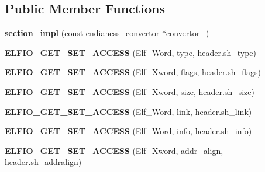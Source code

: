 \subsection*{Public Member Functions}
\begin{DoxyCompactItemize}
\item 
{\bfseries section\+\_\+impl} (const \hyperlink{class_e_l_f_i_o_1_1endianess__convertor}{endianess\+\_\+convertor} $\ast$convertor\+\_\+)\hypertarget{class_e_l_f_i_o_1_1section__impl_aa1aa0ba577737ec0f5debf8d917869cf}{}\label{class_e_l_f_i_o_1_1section__impl_aa1aa0ba577737ec0f5debf8d917869cf}

\item 
{\bfseries E\+L\+F\+I\+O\+\_\+\+G\+E\+T\+\_\+\+S\+E\+T\+\_\+\+A\+C\+C\+E\+SS} (Elf\+\_\+\+Word, type, header.\+sh\+\_\+type)\hypertarget{class_e_l_f_i_o_1_1section__impl_a87070f7ab5768e972178c462662b66c6}{}\label{class_e_l_f_i_o_1_1section__impl_a87070f7ab5768e972178c462662b66c6}

\item 
{\bfseries E\+L\+F\+I\+O\+\_\+\+G\+E\+T\+\_\+\+S\+E\+T\+\_\+\+A\+C\+C\+E\+SS} (Elf\+\_\+\+Xword, flags, header.\+sh\+\_\+flags)\hypertarget{class_e_l_f_i_o_1_1section__impl_a6e28fe60ec05be310ef82794ccc69c03}{}\label{class_e_l_f_i_o_1_1section__impl_a6e28fe60ec05be310ef82794ccc69c03}

\item 
{\bfseries E\+L\+F\+I\+O\+\_\+\+G\+E\+T\+\_\+\+S\+E\+T\+\_\+\+A\+C\+C\+E\+SS} (Elf\+\_\+\+Xword, size, header.\+sh\+\_\+size)\hypertarget{class_e_l_f_i_o_1_1section__impl_abb8836800cacb4adef4f040bd8960f38}{}\label{class_e_l_f_i_o_1_1section__impl_abb8836800cacb4adef4f040bd8960f38}

\item 
{\bfseries E\+L\+F\+I\+O\+\_\+\+G\+E\+T\+\_\+\+S\+E\+T\+\_\+\+A\+C\+C\+E\+SS} (Elf\+\_\+\+Word, link, header.\+sh\+\_\+link)\hypertarget{class_e_l_f_i_o_1_1section__impl_ab959ebb175b320d99170f0e32bd2fbf6}{}\label{class_e_l_f_i_o_1_1section__impl_ab959ebb175b320d99170f0e32bd2fbf6}

\item 
{\bfseries E\+L\+F\+I\+O\+\_\+\+G\+E\+T\+\_\+\+S\+E\+T\+\_\+\+A\+C\+C\+E\+SS} (Elf\+\_\+\+Word, info, header.\+sh\+\_\+info)\hypertarget{class_e_l_f_i_o_1_1section__impl_a879763669a9608b1906bbd742453325a}{}\label{class_e_l_f_i_o_1_1section__impl_a879763669a9608b1906bbd742453325a}

\item 
{\bfseries E\+L\+F\+I\+O\+\_\+\+G\+E\+T\+\_\+\+S\+E\+T\+\_\+\+A\+C\+C\+E\+SS} (Elf\+\_\+\+Xword, addr\+\_\+align, header.\+sh\+\_\+addralign)\hypertarget{class_e_l_f_i_o_1_1section__impl_acc00f2ae97deaf0f529b3c79fb7ad7bf}{}\label{class_e_l_f_i_o_1_1section__impl_acc00f2ae97deaf0f529b3c79fb7ad7bf}


\end{DoxyCompactItemize}
